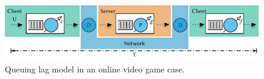 \begin{figure}[!t]
	\centering
	\includegraphics[width=1.0\columnwidth]{../../../models/e2e-lag-model.pdf}
	\caption{Queuing lag model in an online video game case.}
\label{fig:queuing-model}
\end{figure}



